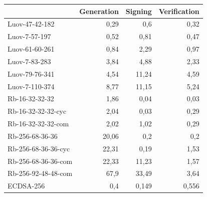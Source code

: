 \documentclass[thesis=M,english]{FITthesis}[2019/12/23]
\begin{document}
\begin{table}[]
\centering
\begin{tabular}{|l|r|r|r|}
\hline
                  & \multicolumn{1}{c|}{{ Generation}} & \multicolumn{1}{c|}{{ Signing}} & \multicolumn{1}{c|}{{ Verification}} \\ \hline
 Luov-47-42-182      &  0,29                            &  0,6                          &  0,32                              \\ \hline
 Luov-7-57-197       &  0,52                            &  0,81                         &  0,47                              \\ \hline
 Luov-61-60-261      &  0,84                            &  2,29                         &  0,97                              \\ \hline
 Luov-7-83-283       &  3,84                            &  4,88                         &  2,33                              \\ \hline
 Luov-79-76-341      &  4,54                            &  11,24                        &  4,59                              \\ \hline
 Luov-7-110-374      &  8,77                            &  11,15                        &  5,24                              \\ \hline
 Rb-16-32-32-32      &  1,86                            &  0,04                         &  0,03                              \\ \hline
 Rb-16-32-32-32-cyc  &  2,04                            &  0,03                         &  0,29                              \\ \hline
 Rb-16-32-32-32-com  &  2,02                            &  1,02                         &  0,29                              \\ \hline
 Rb-256-68-36-36     &  20,06                           &  0,2                          &  0,2                               \\ \hline
 Rb-256-68-36-36-cyc &  22,31                           &  0,19                         &  1,53                              \\ \hline
 Rb-256-68-36-36-com &  22,33                           &  11,23                        &  1,57                              \\ \hline
 Rb-256-92-48-48-com &  67,9                            &  33,49                        &  3,64                              \\ \hline
 ECDSA-256           &  0,4                             &  0,149                        &  0,556                             \\ \hline

\end{tabular}
\end{table}
\end{document}
